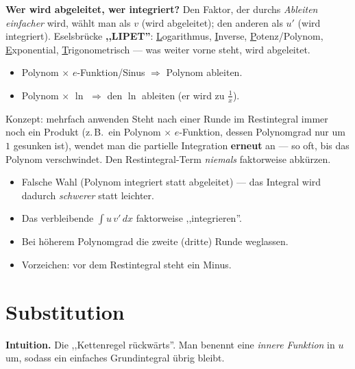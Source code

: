 \documentclass[a4paper,11pt]{article}
\begin{document}
\begin{merkbox}
\textbf{Wer wird abgeleitet, wer integriert?} Den Faktor, der durchs \emph{Ableiten einfacher}
wird, wählt man als $v$ (wird abgeleitet); den anderen als $u'$ (wird integriert).
Eselsbrücke \textbf{,,LIPET''}: \underline{L}ogarithmus, \underline{I}nverse,
\underline{P}otenz/Polynom, \underline{E}xponential, \underline{T}rigonometrisch — was weiter
vorne steht, wird abgeleitet.
\begin{itemize}[leftmargin=1.4em,itemsep=1pt]
  \item Polynom $\times$ $e$-Funktion/Sinus $\Rightarrow$ Polynom ableiten.
  \item Polynom $\times$ $\ln$ $\Rightarrow$ den $\ln$ ableiten (er wird zu $\frac1x$).
\end{itemize}
\end{merkbox}

\begin{bspbox}{Konzept: mehrfach anwenden}
Steht nach einer Runde im Restintegral immer noch ein Produkt (z.\,B.\ ein Polynom $\times$
$e$-Funktion, dessen Polynomgrad nur um $1$ gesunken ist), wendet man die partielle Integration
\textbf{erneut} an — so oft, bis das Polynom verschwindet. Den Restintegral-Term \emph{niemals}
faktorweise abkürzen.
\end{bspbox}

\begin{fehlerbox}
\begin{itemize}[leftmargin=1.4em,itemsep=2pt]
  \item Falsche Wahl (Polynom integriert statt abgeleitet) — das Integral wird dadurch
        \emph{schwerer} statt leichter.
  \item Das verbleibende $\int u\,v'\,dx$ faktorweise ,,integrieren''.
  \item Bei höherem Polynomgrad die zweite (dritte) Runde weglassen.
  \item Vorzeichen: vor dem Restintegral steht ein Minus.
\end{itemize}
\end{fehlerbox}

\section{Substitution}

\textbf{Intuition.} Die ,,Kettenregel rückwärts''. Man benennt eine \emph{innere Funktion} in
$u$ um, sodass ein einfaches Grundintegral übrig bleibt.
\end{document}
